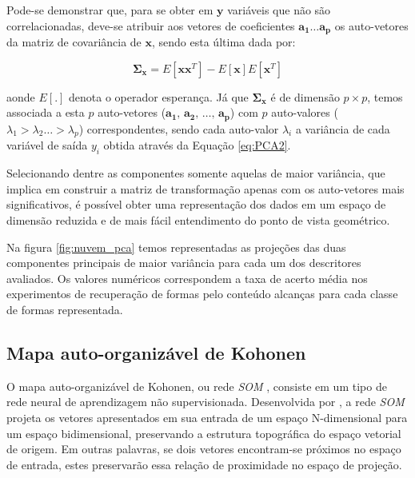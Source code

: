 Pode-se demonstrar que, para se obter em $\mathbf{y}$ variáveis que não são correlacionadas,  deve-se atribuir aos vetores de coeficientes $\mathbf{a_1} \ldots \mathbf{a_p}$ os auto-vetores da matriz de covariância de $\mathbf{x}$, sendo esta última dada por: 

\begin{equation}\label{eq:PCA3}
\mathbf{\Sigma_x} = E{[\mathbf{xx}^T]}-E{[\mathbf{x}]}E{[\mathbf{x}^T]}
\end{equation}

 aonde $E[.]$ denota o operador esperança. 
Já que $\mathbf{\Sigma_x}$ é de dimensão $p \times p$, temos associada a esta $p$ auto-vetores ($\mathbf{a_1}\text{, }\mathbf{a_2}\text{, }\ldots\text{, }\mathbf{a_p}$) com $p$ auto-valores ($\lambda_1 > \lambda_2 \ldots > \lambda_p$) correspondentes, sendo cada auto-valor $\lambda_i$ a variância de cada variável de saída $y_i$ obtida através da Equação \ref{eq:PCA2}. 

Selecionando dentre as componentes somente aquelas de maior variância, que implica em construir a matriz de transformação apenas com os auto-vetores mais significativos, é possível obter uma representação dos dados em um espaço de dimensão reduzida e de mais fácil entendimento do ponto de vista geométrico.

Na figura \ref{fig:nuvem_pca} temos representadas as projeções das duas componentes principais de maior variância para cada um dos descritores avaliados. Os valores numéricos correspondem a taxa de acerto média nos experimentos de recuperação de formas pelo conteúdo alcanças para cada classe de formas representada.

\subsection{Mapa auto-organizável de Kohonen}

O mapa auto-organizável de Kohonen, ou rede \emph{SOM} \cite{Kohonen:2001}, consiste em um tipo de rede neural de aprendizagem não supervisionada. Desenvolvida por , a rede \emph{SOM} projeta os vetores apresentados em sua entrada de um espaço N-dimensional para um espaço bidimensional, preservando a estrutura topográfica do espaço vetorial de origem. Em outras palavras, se dois vetores encontram-se próximos no espaço de entrada, estes preservarão essa relação de proximidade no espaço de projeção. 

\begin{comment}
Em seu processo de treinamento, a rede \emph{SOM} agrupa os vetores de entrada através de um processo de aprendizado competitivo mantendo a estrutura topológica do espaço vetorial de entrada.
\end{comment}

